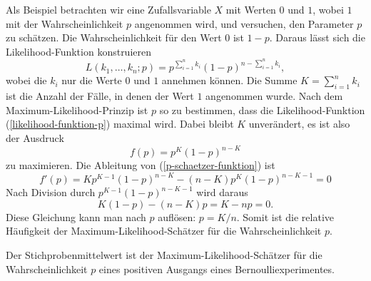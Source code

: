 Als Beispiel betrachten wir eine Zufallsvariable $X$ mit Werten $0$ und
$1$, wobei $1$ mit der Wahrscheinlichkeit $p$ angenommen wird,
und versuchen, den Parameter $p$ zu schätzen.
Die Wahrscheinlichkeit
für den Wert $0$ ist $1-p$.
Daraus lässt sich die Likelihood-Funktion konstruieren
\begin{equation}
L(k_1,\dots,k_n;p)=p^{\sum_{i=1}^nk_i}(1-p)^{n-\sum_{i=1}^nk_i},
\label{likelihood-funktion-p}
\end{equation}
wobei die $k_i$ nur die Werte $0$ und $1$ annehmen können.
Die Summe 
$K=\sum_{i=1}^nk_i$ ist die Anzahl der Fälle, in denen der Wert $1$
angenommen wurde.
Nach dem Maximum-Likelihood-Prinzip ist $p$ so zu bestimmen,
dass die Likelihood-Funktion
(\ref{likelihood-funktion-p})
maximal wird.
Dabei bleibt $K$ unverändert, es ist also der Ausdruck
\begin{equation}
f(p)=p^K(1-p)^{n-K}
\label{p-schaetzer-funktion}
\end{equation}
zu maximieren.
Die Ableitung von (\ref{p-schaetzer-funktion}) ist
\begin{equation}
f'(p)=Kp^{K-1}(1-p)^{n-K}-(n-K)p^K(1-p)^{n-K-1}=0
\end{equation}
Nach Division durch $p^{K-1}(1-p)^{n-K-1}$ wird daraus
\begin{equation}
K(1-p)-(n-K)p=K-np=0.
\end{equation}
Diese Gleichung kann man nach $p$ auflösen: $p=K/n$.
Somit ist die relative Häufigkeit der Maximum-Likelihood-Schätzer
für die Wahrscheinlichkeit $p$.
\begin{satz}
Der Stichprobenmittelwert ist der Maximum-Likelihood-Schätzer
für die Wahrscheinlichkeit $p$ eines
positiven Ausgangs eines Bernoulliexperimentes.
\end{satz}

